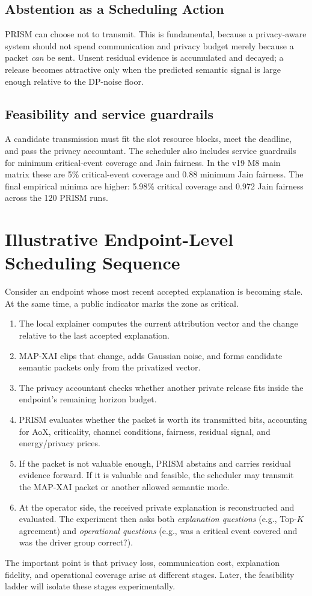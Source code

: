 \documentclass[11pt]{article}
\begin{document}
\subsection{Abstention as a Scheduling Action}
PRISM can choose not to transmit. This is fundamental, because a privacy-aware system should not spend communication and privacy budget merely because a packet \emph{can} be sent. Unsent residual evidence is accumulated and decayed; a release becomes attractive only when the predicted semantic signal is large enough relative to the DP-noise floor.

\subsection{Feasibility and service guardrails}
A candidate transmission must fit the slot resource blocks, meet the deadline, and pass the privacy accountant. The scheduler also includes service guardrails for minimum critical-event coverage and Jain fairness. In the v19 M8 main matrix these are 5\% critical-event coverage and 0.88 minimum Jain fairness. The final empirical minima are higher: 5.98\% critical coverage and 0.972 Jain fairness across the 120 PRISM runs.

\section{Illustrative Endpoint-Level Scheduling Sequence}
Consider an endpoint whose most recent accepted explanation is becoming stale. At the same time, a public indicator marks the zone as critical.
\begin{enumerate}[leftmargin=2em]
\item The local explainer computes the current attribution vector and the change relative to the last accepted explanation.
\item MAP-XAI clips that change, adds Gaussian noise, and forms candidate semantic packets only from the privatized vector.
\item The privacy accountant checks whether another private release fits inside the endpoint's remaining horizon budget.
\item PRISM evaluates whether the packet is worth its transmitted bits, accounting for AoX, criticality, channel conditions, fairness, residual signal, and energy/privacy prices.
\item If the packet is not valuable enough, PRISM abstains and carries residual evidence forward. If it is valuable and feasible, the scheduler may transmit the MAP-XAI packet or another allowed semantic mode.
\item At the operator side, the received private explanation is reconstructed and evaluated. The experiment then asks both \emph{explanation questions} (e.g., Top-$K$ agreement) and \emph{operational questions} (e.g., was a critical event covered and was the driver group correct?).
\end{enumerate}
The important point is that privacy loss, communication cost, explanation fidelity, and operational coverage arise at different stages. Later, the feasibility ladder will isolate these stages experimentally.
\end{document}
